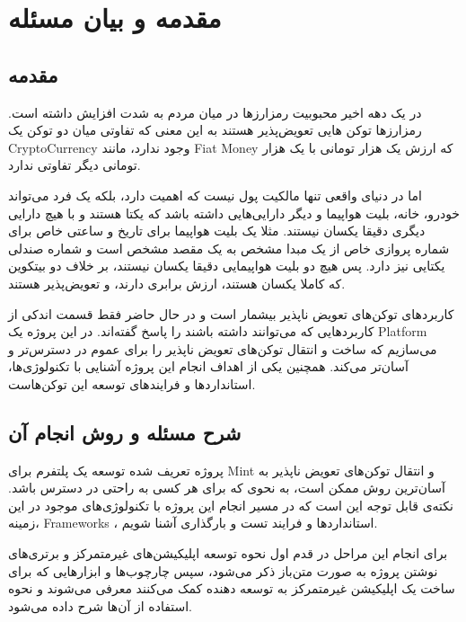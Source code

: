 
\chapter{مقدمه و بیان مسئله}

\section{مقدمه}
در یک دهه اخیر محبوبیت رمزارز‌ها در میان مردم به شدت افزایش داشته است. رمزارزها توکن هایی تعویض‌پذیر هستند به این معنی که تفاوتی میان دو توکن یک
\gls{CryptoCurrency}
وجود ندارد، مانند
\gls{Fiat Money}
که ارزش یک هزار تومانی با یک هزار تومانی دیگر تفاوتی ندارد.

اما در دنیای واقعی تنها مالکیت پول نیست که اهمیت دارد، بلکه یک فرد می‌تواند خودرو، خانه، بلیت هواپیما و دیگر دارایی‌هایی داشته باشد که یکتا هستند و با هیچ دارایی دیگری دقیقا یکسان نیستند. مثلا یک بلیت هواپیما برای تاریخ و ساعتی خاص برای شماره پروازی خاص از یک مبدا مشخص به یک مقصد مشخص است و شماره صندلی یکتایی نیز دارد. پس هیچ دو بلیت هواپیمایی دقیقا یکسان نیستند، بر خلاف دو بیتکوین که کاملا یکسان هستند، ارزش برابری دارند، و تعویض‌پذیر هستند.

کاربردهای توکن‌های تعویض ناپذیر بیشمار است و در حال حاضر فقط قسمت اندکی از کاربردهایی که می‌توانند داشته باشند را پاسخ گفته‌اند. در این پروژه یک
\gls{Platform}
می‌سازیم که ساخت و انتقال توکن‌های تعویض ناپذیر را برای عموم در دسترس‌تر و آسان‌تر می‌کند. همچنین یکی از اهداف انجام این پروژه آشنایی با تکنولوژی‌ها، استاندارد‌ها و فرایند‌های توسعه این توکن‌هاست.


\section{شرح مسئله و روش انجام آن}
پروژه تعریف شده توسعه یک پلتفرم برای
\gls{Mint}
و انتقال توکن‌های تعویض ناپذیر به آسان‌ترین روش ممکن است، به نحوی که برای هر کسی به راحتی در دسترس باشد. نکته‌ی قابل توجه‌ این است که در مسیر انجام این پروژه با تکنولوژی‌های موجود در این زمینه، 
\glspl{Framework}
، استاندارد‌ها و فرایند تست و بارگذاری آشنا شویم.

برای انجام این مراحل در قدم اول نحوه توسعه اپلیکیشن‌های غیرمتمرکز و برتری‌های نوشتن پروژه به صورت متن‌باز ذکر می‌شود، سپس چارچوب‌ها و ابزار‌هایی که برای ساخت یک اپلیکیشن غیرمتمرکز به توسعه دهنده کمک می‌کنند معرفی می‌شوند و نحوه استفاده از آن‌ها شرح داده می‌شود.

